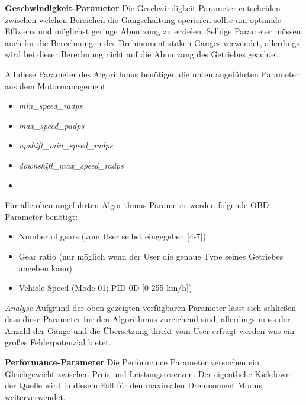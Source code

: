 	\textbf{Geschwindigkeit-Parameter}
	Die Geschwindigkeit Parameter entscheiden zwischen welchen Bereichen die Gangschaltung operieren sollte um optimale Effizienz und möglichst geringe Abnutzung zu erzielen. Selbige Parameter müssen auch für die Berechnungen des 
	Drehmoment-staken Ganges verwendet, allerdings wird bei dieser Berechnung nicht auf die Abnutzung des Getriebes geachtet.

	All diese Parameter des Algorithmus benötigen die unten angeführten Parameter aus dem Motormanagement:
	\begin{itemize}
		\item \textit{min_speed_radps}
		\cite{The speed below which the transmission must downshift}
		\item \textit{max_speed_padps}
		\cite{The speed above which the transmission must upshift.}
		\item \textit{upshift_min_speed_radps}
		\cite{The minimum speed required in a gear before upshift to that gear is allowed. Provides headroom above the min_speed_radps}
		\item \textit{downshift_max_speed_radps}
		\cite{The maximum speed allowed in a gear at the time of downshifting to that gear. [...] Provides headroom to downshift without hitting the max_speed_radps}
		\item
	\end{itemize}
	Für alle oben angeführten Algorithmus-Parameter werden folgende OBD-Parameter benötigt:
	\begin{itemize}
		\item Number of gears (vom User selbst eingegeben [4-7])
		\item Gear ratio (nur möglich wenn der User die genaue Type seines Getriebes angeben kann)
		\item Vehicle Speed (Mode 01; PID 0D [0-255 km/h])
	\end{itemize}

	\textit{Analyse}
	Aufgrund der oben gezeigten verfügbaren Parameter lässt sich schließen dass diese Parameter für den Algorithmus zureichend sind, allerdings muss der Anzahl der Gänge und die Übersetzung direkt vom User erfragt werden was ein großes Fehlerpotenzial bietet.

	\textbf{Performance-Parameter}
	Die Performance Parameter versuchen ein Gleichgewicht zwischen Preis und Leistungsreserven. Der eigentliche Kickdown der Quelle wird in diesem Fall für den maximalen Drehmoment Modus weiterverwendet.

